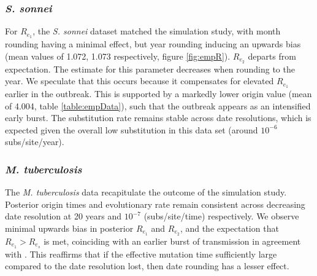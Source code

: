 \documentclass{article}
\begin{document}
\begin{spacing}{1.5}
\subsubsection*{\textit{S. sonnei}}
For $R_{e_1}$, the \textit{S. sonnei} dataset matched the simulation study, with month rounding having a minimal effect, but year rounding inducing an upwards bias (mean values of 1.072, 1.073 respectively, figure \ref{fig:empR}). $R_{e_2}$ departs from expectation. The estimate for this parameter decreases when rounding to the year. We speculate that this occurs because it compensates for elevated $R_{e_1}$ earlier in the outbreak. This is supported by a markedly lower origin value (mean of 4.004, table \ref{table:empData}), such that the outbreak appears as an intensified early burst. The substitution rate remains stable across date resolutions, which is expected given the overall low substitution in this data set (around $10^{-6}$ subs/site/year).

\subsubsection*{\textit{M. tuberculosis}}
The \textit{M. tuberculosis} data recapitulate the outcome of the simulation study. Posterior origin times and evolutionary rate remain consistent across decreasing date resolution at 20 years and $10^{-7}$ (subs/site/time) respectively. We observe minimal upwards bias in posterior $R_{e_1}$ and $R_{e_2}$, and the expectation that $R_{e_1} > R_{e_s}$ is met, coinciding with an earlier burst of transmission in agreement with \citet{kuhnert_tuberculosis_2018}. This reaffirms that if the effective mutation time sufficiently large compared to the date resolution lost, then date rounding has a lesser effect.


\end{spacing}
\end{document}
